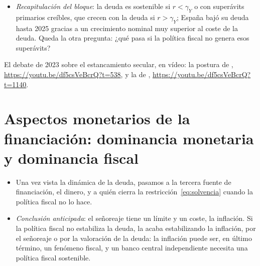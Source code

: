 \documentclass[11pt]{article}
\begin{document}
\begin{itemize}
\begin{itemize}
  \item pero el diferencial no avisa antes de las crisis: \textcite{MauroZhou2020rg} encuentran, con datos de muchos países y siglos, que ha sido negativo con frecuencia y que no es mayor antes de los impagos;
  \item detrás de los tipos bajos estaba el \emph{estancamiento secular}: según \textcite{RachelSummers2019Secular}, el tipo real neutral cayó al menos 300~puntos básicos en una generación. En 2023,  sostuvo que había terminado y , que no\nocite{Blanchard2023Secular,PIIE2023Debate} .
  \end{itemize}
\item \emph{Recapitulación del bloque}: la deuda es sostenible si $r<\gamma_Y$ o con superávits primarios creíbles, que crecen con la deuda si $r>\gamma_Y$; España bajó su deuda hasta 2025 gracias a un crecimiento nominal muy superior al coste de la deuda. Queda la otra pregunta: ¿qué pasa si la política fiscal no genera esos superávits?
\end{itemize}

\begin{anotaciones}
El debate de 2023 sobre el estancamiento secular, en vídeo\nocite{PIIE2023Debate}: la postura de , \url{https://youtu.be/df5csVeBcrQ?t=538}, y la de , \url{https://youtu.be/df5csVeBcrQ?t=1140}.
\end{anotaciones}

\section{Aspectos monetarios de la financiación:\cortetitulo{} dominancia monetaria y dominancia fiscal}\label{sec:dominacion}

\begin{itemize}
\item Una vez vista la dinámica de la deuda, pasamos a la tercera fuente de financiación, el dinero, y a quién cierra la restricción~\eqref{eq:solvencia} cuando la política fiscal no lo hace.
\item \emph{Conclusión anticipada}: el señoreaje tiene un límite y un coste, la inflación. Si la política fiscal no estabiliza la deuda, la acaba estabilizando la inflación, por el señoreaje o por la valoración de la deuda: la inflación puede ser, en último término, un fenómeno fiscal, y un banco central independiente necesita una política fiscal sostenible.
\end{itemize}
\end{document}
